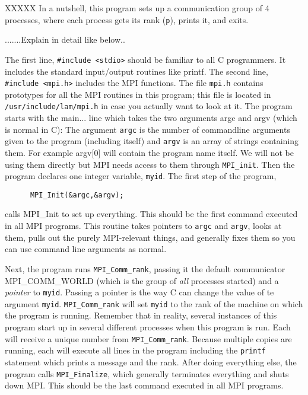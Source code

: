 \documentclass[12pt]{article}
\begin{document}
XXXXX
In a nutshell, this program sets up a communication group of 4
processes, where each process gets its rank (\texttt{p}), prints it,
and exits.

.......Explain in detail like below..




The first line,
\texttt{\#include <stdio>}
should be familiar to all C programmers. It includes the standard
input/output routines like printf. The second line,
\texttt{\#include <mpi.h>}
includes the MPI functions. The file \texttt{mpi.h}
contains prototypes for all the
MPI routines in this program; this file is located in
\texttt{/usr/include/lam/mpi.h} in case you actually want to look at it.
The program starts with the main... line which takes the two arguments
argc and argv (which is normal in C): The argument \texttt{argc} is
the number of commandline arguments given to the program (including itself)
and \texttt{argv} is an array of strings containing them. For example
argv[0] will contain the program name itself. We will not be using them
directly but MPI needs access to them through \texttt{MPI\_init}.
Then the program declares one integer variable, \texttt{myid}. The
first step of the program,
\begin{verbatim}
      MPI_Init(&argc,&argv);
\end{verbatim}
calls MPI\_Init to set up everything.
This should be the first command executed in all MPI programs. This
routine takes pointers to \texttt{argc} and \texttt{argv},
looks at them, pulls out the purely
MPI-relevant things, and generally fixes them so you can use command line
arguments as normal.

\medskip

Next, the program runs \texttt{MPI\_Comm\_rank},
passing it the default communicator MPI\_COMM\_WORLD
(which is the group of \emph{all} processes started)
and a \emph{pointer} to \texttt{myid}. Passing a pointer is the way
C can change the value of te argument \texttt{myid}.
\texttt{MPI\_Comm\_rank} will set \texttt{myid} to the rank of the machine
on which the program is running.
Remember that in reality, several instances of this program
start up in several different processes when this program is run. Each
will receive a unique number from \texttt{MPI\_Comm\_rank}.
Because multiple copies are running, each will execute all lines
in the program including the \texttt{printf} statement which prints a
message and the rank.
After doing everything else, the program calls \texttt{MPI\_Finalize},
which generally terminates everything and shuts down MPI. This should be the
last command executed in all MPI programs.
\end{document}
